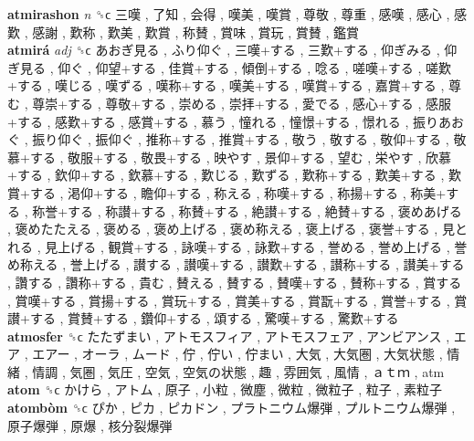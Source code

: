 \textbf{atmirashon} \emph{n}  ␝ϲ   三嘆 ,  了知 ,  会得 ,  嘆美 ,  嘆賞 ,  尊敬 ,  尊重 ,  感嘆 ,  感心 ,  感歎 ,  感謝 ,  歎称 ,  歎美 ,  歎賞 ,  称賛 ,  賞味 ,  賞玩 ,  賞賛 ,  鑑賞   \\
\textbf{atmirá} \emph{adj}  ␝ϲ   あおぎ見る ,  ふり仰ぐ ,  三嘆+する ,  三歎+する ,  仰ぎみる ,  仰ぎ見る ,  仰ぐ ,  仰望+する ,  佳賞+する ,  傾倒+する ,  唸る ,  嗟嘆+する ,  嗟歎+する ,  嘆じる ,  嘆ずる ,  嘆称+する ,  嘆美+する ,  嘆賞+する ,  嘉賞+する ,  尊む ,  尊崇+する ,  尊敬+する ,  崇める ,  崇拝+する ,  愛でる ,  感心+する ,  感服+する ,  感歎+する ,  感賞+する ,  慕う ,  憧れる ,  憧憬+する ,  憬れる ,  振りあおぐ ,  振り仰ぐ ,  振仰ぐ ,  推称+する ,  推賞+する ,  敬う ,  敬する ,  敬仰+する ,  敬慕+する ,  敬服+する ,  敬畏+する ,  映やす ,  景仰+する ,  望む ,  栄やす ,  欣慕+する ,  欽仰+する ,  欽慕+する ,  歎じる ,  歎ずる ,  歎称+する ,  歎美+する ,  歎賞+する ,  渇仰+する ,  瞻仰+する ,  称える ,  称嘆+する ,  称揚+する ,  称美+する ,  称誉+する ,  称讃+する ,  称賛+する ,  絶讃+する ,  絶賛+する ,  褒めあげる ,  褒めたたえる ,  褒める ,  褒め上げる ,  褒め称える ,  褒上げる ,  褒誉+する ,  見とれる ,  見上げる ,  観賞+する ,  詠嘆+する ,  詠歎+する ,  誉める ,  誉め上げる ,  誉め称える ,  誉上げる ,  讃する ,  讃嘆+する ,  讃歎+する ,  讃称+する ,  讃美+する ,  讚する ,  讚称+する ,  貴む ,  賛える ,  賛する ,  賛嘆+する ,  賛称+する ,  賞する ,  賞嘆+する ,  賞揚+する ,  賞玩+する ,  賞美+する ,  賞翫+する ,  賞誉+する ,  賞讃+する ,  賞賛+する ,  鑽仰+する ,  頌する ,  驚嘆+する ,  驚歎+する   \\
\textbf{atmosfer} ␝ϲ   たたずまい ,  アトモスフィア ,  アトモスフェア ,  アンビアンス ,  エア ,  エアー ,  オーラ ,  ムード ,  佇 ,  佇い ,  佇まい ,  大気 ,  大気圏 ,  大気状態 ,  情緒 ,  情調 ,  気圏 ,  気圧 ,  空気 ,  空気の状態 ,  趣 ,  雰囲気 ,  風情 ,  ａｔｍ , atm  \\
\textbf{atom} ␝ϲ   かけら ,  アトム ,  原子 ,  小粒 ,  微塵 ,  微粒 ,  微粒子 ,  粒子 ,  素粒子   \\
\textbf{atombòm} ␝ϲ   ぴか ,  ピカ ,  ピカドン ,  プラトニウム爆弾 ,  プルトニウム爆弾 ,  原子爆弾 ,  原爆 ,  核分裂爆弾   \\
